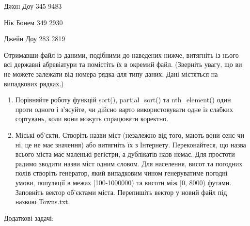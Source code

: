 \documentclass[]{article}
\begin{document}
Джон Доу 345 9483

Нік Бонем 349 2930

Джейн Доу 283 2819

Отримавши файл із даними, подібними до наведених нижче, витягніть із
нього всі державні абревіатури та помістіть їх в окремий файл. (Зверніть
увагу, що ви не можете залежати від номера рядка для типу даних. Дані
містяться на випадкових рядках.)

\begin{enumerate}
\def\labelenumi{\arabic{enumi})}
\item
  Порівняйте роботу функцій sort(), partial\_sort() та nth\_element()
  один проти одного і з'ясуйте, чи дійсно варто використовувати одне із
  слабких сортувань, коли вони можуть спрацювати коректно.
\item
  Міські об'єкти. Створіть назви міст (незалежно від того, мають вони
  сенс чи ні, це не має значення) або витягніть їх з Інтернету.
  Переконайтеся, що назва всього міста має маленькі регістри, а
  дублікатів назв немає. Для простоти радимо зводити назви міст одним
  словом. Для населення, висот та погодних полів створіть генератор,
  який випадковим чином генеруватиме погодні умови, популяції в межах
  {[}100-1000000) та висоти між {[}0, 8000) футами. Заповніть вектор
  об'єктами міста. Перепишіть вектор у новий файл під назвою Towns.txt.
\end{enumerate}

Додаткові задачі:
\end{document}
